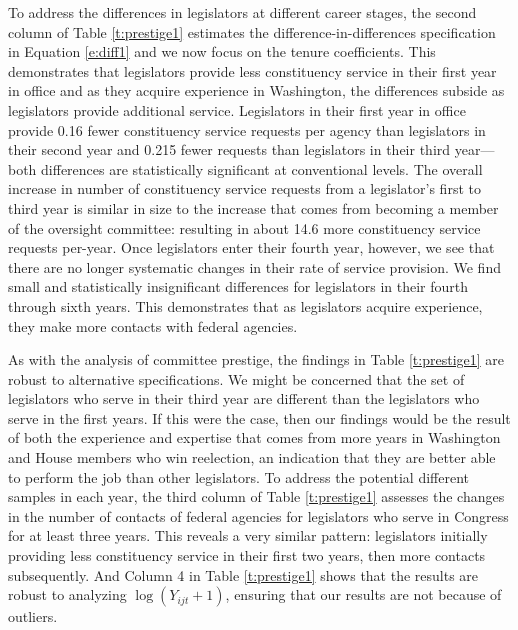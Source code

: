 \documentclass[12pt]{article}
\begin{document}
% 


To address the differences in legislators at different career stages, the second column of Table \ref{t:prestige1} estimates the difference-in-differences specification in Equation \ref{e:diff1} and we now focus on the tenure coefficients. This demonstrates that legislators provide less constituency service in their first year in office and as they acquire experience in Washington, the differences subside as legislators provide additional service. Legislators in their first year in office provide 0.16 fewer constituency service requests per agency than legislators in their second year and 0.215 fewer requests than legislators in their third year---both differences are statistically significant at conventional levels. The overall increase in number of constituency service requests from a legislator's first to third year is similar in size to the increase that comes from becoming a member of the oversight committee: resulting in about 14.6 more constituency service requests per-year. Once legislators enter their fourth year, however, we see that there are no longer systematic changes in their rate of service provision. We find small and statistically insignificant differences for legislators in their fourth through sixth years. This demonstrates that as legislators acquire experience, they make more contacts with federal agencies.  

As with the analysis of committee prestige, the findings in Table \ref{t:prestige1} are robust to alternative specifications. We might be concerned that the set of legislators who serve in their third year are different than the legislators who serve in the first years. If this were the case, then our findings would be the result of both the experience and expertise that comes from more years in Washington and House members who win reelection, an indication that they are better able to perform the job than other legislators. To address the potential different samples in each year, the third column of Table \ref{t:prestige1} assesses the changes in the number of contacts of federal agencies for legislators who serve in Congress for at least three years. This reveals a very similar pattern: legislators initially providing less constituency service in their first two years, then more contacts subsequently. And Column 4 in Table \ref{t:prestige1} shows that the results are robust to analyzing $\log(Y_{ijt} + 1)$, ensuring that our results are not because of outliers.  
\end{document}
